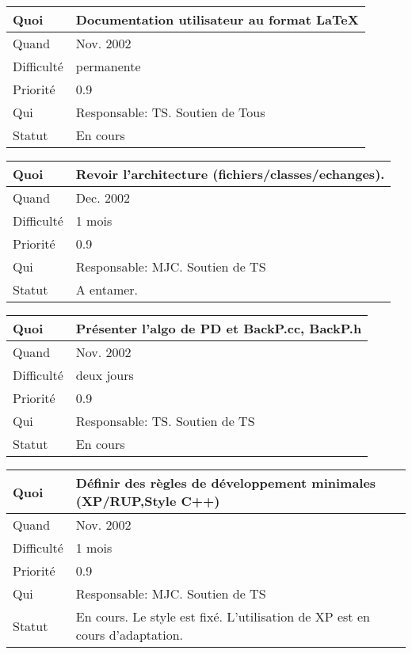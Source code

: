 \documentclass[a4paper,11pt]{article}
\begin{document}
\begin{longtable}{|l|p{7cm}|}\hline
  Quoi & Documentation utilisateur au format LaTeX\\\hline
  Quand  &  Nov. 2002\\\hline
  Difficult\'e &  permanente\\\hline
  Priorit\'e &  0.9 \\\hline
  Qui & Responsable: TS. Soutien de Tous\\\hline
  Statut & En cours\\\hline
\end{longtable}

\begin{longtable}{|l|p{7cm}|}\hline
  Quoi & Revoir l'architecture (fichiers/classes/echanges).\\\hline
  Quand  &  Dec. 2002\\\hline
  Difficult\'e &  1 mois\\\hline
  Priorit\'e &  0.9 \\\hline
  Qui & Responsable: MJC. Soutien de TS\\\hline
  Statut & A entamer. \\\hline
\end{longtable}

\begin{longtable}{|l|p{7cm}|}\hline
  Quoi & Pr{\'e}senter l'algo de PD et BackP.cc, BackP.h \\\hline
  Quand  &  Nov. 2002\\\hline
  Difficult\'e & deux jours  \\\hline
  Priorit\'e &  0.9\\\hline
  Qui & Responsable: TS. Soutien de TS\\\hline
  Statut & En cours\\\hline
\end{longtable}

\begin{longtable}{|l|p{7cm}|}\hline
  Quoi & D\'efinir des r\`egles de d\'eveloppement minimales (XP/RUP,Style C++)\\\hline
  Quand  & Nov. 2002 \\\hline
  Difficult\'e & 1 mois \\\hline
  Priorit\'e &  0.9 \\\hline
  Qui & Responsable: MJC. Soutien de TS \\\hline
  Statut & En cours. Le style est fix\'e. L'utilisation de XP est en
  cours d'adaptation.\\\hline
\end{longtable}
\end{document}
